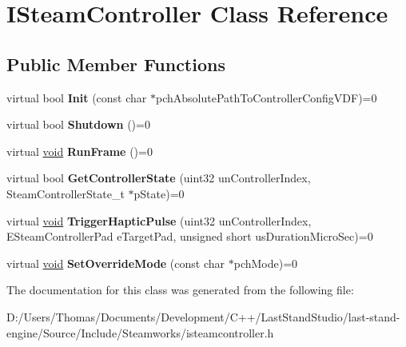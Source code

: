 \hypertarget{classISteamController}{}\section{I\+Steam\+Controller Class Reference}
\label{classISteamController}
\subsection*{Public Member Functions}
\begin{DoxyCompactItemize}
\item 
\hypertarget{classISteamController_a300f99a0917ffbfe490ff5f686c5ab10}{}virtual bool {\bfseries Init} (const char $\ast$pch\+Absolute\+Path\+To\+Controller\+Config\+V\+D\+F)=0\label{classISteamController_a300f99a0917ffbfe490ff5f686c5ab10}

\item 
\hypertarget{classISteamController_a890b4d6da07a7f082d97a599a453ba82}{}virtual bool {\bfseries Shutdown} ()=0\label{classISteamController_a890b4d6da07a7f082d97a599a453ba82}

\item 
\hypertarget{classISteamController_a648bba21ca5b9a1543c378a9fdda84e3}{}virtual \hyperlink{SDL__audio_8h_a52835ae37c4bb905b903cbaf5d04b05f}{void} {\bfseries Run\+Frame} ()=0\label{classISteamController_a648bba21ca5b9a1543c378a9fdda84e3}

\item 
\hypertarget{classISteamController_ac95bb229756c8c4309f9e632fd7a753f}{}virtual bool {\bfseries Get\+Controller\+State} (uint32 un\+Controller\+Index, Steam\+Controller\+State\+\_\+t $\ast$p\+State)=0\label{classISteamController_ac95bb229756c8c4309f9e632fd7a753f}

\item 
\hypertarget{classISteamController_a7b0af53d57459c9dfd2b243400807dae}{}virtual \hyperlink{SDL__audio_8h_a52835ae37c4bb905b903cbaf5d04b05f}{void} {\bfseries Trigger\+Haptic\+Pulse} (uint32 un\+Controller\+Index, E\+Steam\+Controller\+Pad e\+Target\+Pad, unsigned short us\+Duration\+Micro\+Sec)=0\label{classISteamController_a7b0af53d57459c9dfd2b243400807dae}

\item 
\hypertarget{classISteamController_a0a96f28b640ac81e6eeb471fcdb71380}{}virtual \hyperlink{SDL__audio_8h_a52835ae37c4bb905b903cbaf5d04b05f}{void} {\bfseries Set\+Override\+Mode} (const char $\ast$pch\+Mode)=0\label{classISteamController_a0a96f28b640ac81e6eeb471fcdb71380}

\end{DoxyCompactItemize}


The documentation for this class was generated from the following file\+:\begin{DoxyCompactItemize}
\item 
D\+:/\+Users/\+Thomas/\+Documents/\+Development/\+C++/\+Last\+Stand\+Studio/last-\/stand-\/engine/\+Source/\+Include/\+Steamworks/isteamcontroller.\+h\end{DoxyCompactItemize}
